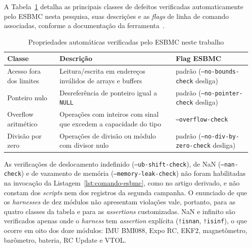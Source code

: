 A Tabela~\ref{tab:propriedades-automaticas} detalha as principais classes de defeitos verificadas automaticamente pelo ESBMC nesta pesquisa, suas descrições e as \textit{flags} de linha de comando associadas, conforme a documentação da ferramenta~\cite{ESBMC_GitHub}.

\begin{table}[!htb]
\centering
\caption{Propriedades automáticas verificadas pelo ESBMC neste trabalho}
\label{tab:propriedades-automaticas}
\footnotesize
\begin{tabular}{|>{\raggedright\arraybackslash}p{2.8cm}|>{\raggedright\arraybackslash}p{6.2cm}|>{\raggedright\arraybackslash}p{4.0cm}|}
\hline
\textbf{Classe} & \textbf{Descrição} & \textbf{Flag ESBMC} \\
\hline
Acesso fora dos limites & Leitura/escrita em endereços inválidos de arrays e buffers & padrão (\texttt{--no-bounds-check} desliga) \\
\hline
Ponteiro nulo & Desreferência de ponteiro igual a \texttt{NULL} & padrão (\texttt{--no-pointer-check} desliga) \\
\hline
Overflow aritmético & Operações com inteiros com sinal que excedem a capacidade do tipo & \texttt{--overflow-check} \\
\hline
Divisão por zero & Operações de divisão ou módulo com divisor nulo & padrão (\texttt{--no-div-by-zero-check} desliga) \\
\hline
\end{tabular}

\footnotesize
\begin{flushleft}
\end{flushleft}
\end{table}

As verificações de deslocamento indefinido (\texttt{--ub-shift-check}), de NaN (\texttt{--nan-check}) e de vazamento de memória
(\texttt{--memory-leak-check}) não foram habilitadas na invocação da
Listagem~\ref{lst:comando-esbmc}, como no artigo derivado, e não constam dos \textit{scripts} nem dos registros da segunda campanha. O enunciado de que
os \textit{harnesses} de dez módulos não apresentam violações vale, portanto, para
as quatro classes da tabela e para as \textit{assertions} customizadas. NaN e
infinito são verificados apenas onde o \textit{harness} tem \textit{assertion}
explícita (\texttt{!isnan}, \texttt{!isinf}), o que ocorre em oito dos doze
módulos: IMU BMI088, Expo RC, EKF2, magnetômetro, barômetro, bateria, RC Update e
VTOL.

